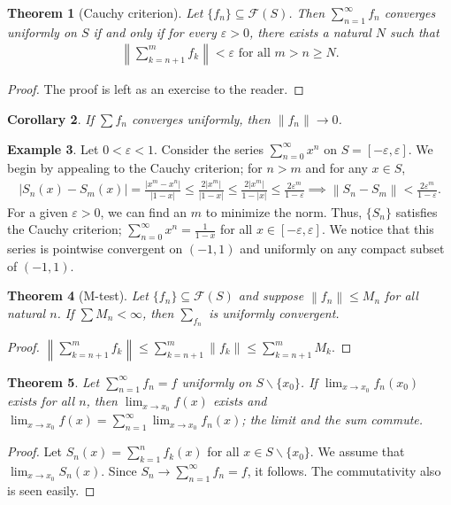 \documentclass[15pt,a4paper]{book}
\newtheorem{theorem}{Theorem}[chapter]
\newtheorem{corollary}[theorem]{Corollary}
\theoremstyle{definition}
\newtheorem{example}[theorem]{Example}
\newcommand{\abs}[1]{\left| #1 \right|} %
\newcommand{\cF}{\mathcal{F}}
\newcommand{\norm}[1]{\left\lVert#1\right\rVert}
\begin{document}
\begin{theorem}[Cauchy criterion]
    Let $\{f_{n}\} \subseteq \cF(S)$. Then $\sum_{n=1}^{\infty} f_{n}$ converges uniformly on $S$ if and only if for every $\varepsilon > 0$, there exists a natural $N$ such that
    \begin{align*}
        \norm{\sum_{k=n+1}^{m}f_{k}} < \varepsilon \text{ for all } m>n \geq N.
    \end{align*}
\end{theorem}
\begin{proof}
    The proof is left as an exercise to the reader.
\end{proof}

\begin{corollary}
    If $\sum f_{n}$ converges uniformly, then $\norm{f_{n}} \to 0$.
\end{corollary}


\begin{example}
    Let $0 < \varepsilon < 1$. Consider the series $\sum_{n=0}^{\infty} x^{n}$ on $S = [-\varepsilon,\varepsilon]$. We begin by appealing to the Cauchy criterion; for $n > m$ and for any $x \in S$,
    \begin{align}
        \abs{S_{n}(x)-S_{m}(x)} = \frac{\abs{x^{m}-x^{n}}}{\abs{1-x}} \leq \frac{2\abs{x^{m}}}{\abs{1-x}} \leq \frac{2\abs{x^{m}}}{1-\abs{x}} \leq \frac{2\varepsilon^{m}}{1-\varepsilon} \implies \norm{S_{n}-S_{m}} < \frac{2\varepsilon^{m}}{1-\varepsilon}.
    \end{align}
    For a given $\varepsilon > 0$, we can find an $m$ to minimize the norm. Thus, $\{S_{n}\}$ satisfies the Cauchy criterion; $\sum_{n=0}^{\infty} x^{n} = \frac{1}{1-x}$ for all $x \in [-\varepsilon,\varepsilon]$. We notice that this series is pointwise convergent on $(-1,1)$ and uniformly on any compact subset of $(-1,1)$.
\end{example}

\begin{theorem}[M-test]
    Let $\{f_{n}\} \subseteq \cF(S)$ and suppose $\norm{f_{n}} \leq M_{n}$ for all natural $n$. If $\sum M_{n} < \infty$, then $\sum_{f_{n}}$ is uniformly convergent.
\end{theorem}
\begin{proof}
    $\norm{\sum_{k=n+1}^{m} f_{k}} \leq \sum_{k=n+1}^{m} \norm{f_{k}} \leq \sum_{k=n+1}^{m} M_{k}$.
\end{proof}

\begin{theorem}
    Let $\sum_{n=1}^{\infty} f_{n} = f$ uniformly on $S\backslash \{x_{0}\}$. If $\lim_{x \to x_{0}}f_{n}(x_{0})$ exists for all $n$, then $\lim_{x \to x_{0}} f(x)$ exists and $\lim_{x \to x_{0}} f(x) = \sum_{n=1}^{\infty} \lim_{x \to x_{0}} f_{n}(x)$; the limit and the sum commute.
\end{theorem}
\begin{proof}
    Let $S_{n}(x) = \sum_{k=1}^{n} f_{k}(x)$ for all $x \in S\backslash\{x_{0}\}$. We assume that $\lim_{x \to x_{0}} S_{n}(x)$. Since $S_{n} \to \sum_{n=1}^{\infty} f_{n} = f$, it follows. The commutativity also is seen easily.
\end{proof}
\end{document}
